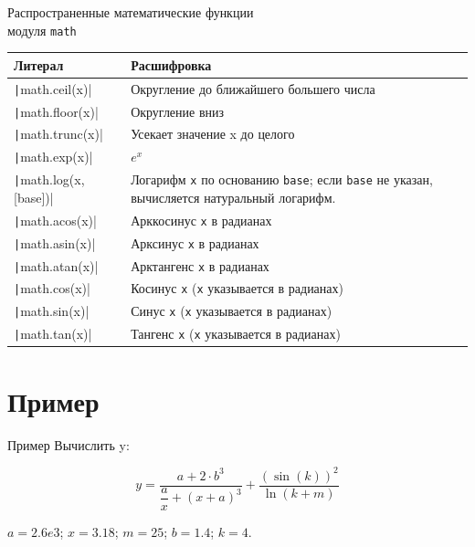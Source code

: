 \documentclass[aspectratio=169]{beamer}	%
\begin{document}
\begin{frame}[fragile]{Распространенные математические функции \\ модуля \texttt{math}}
\scriptsize
\begin{table}
\begin{tabular}{|p{.3\linewidth}|p{.69\linewidth}|}
	\hline
	\textbf{Литерал} & \textbf{Расшифровка} \\
	\hline
	\texttt|math.ceil(x)| & Округление до ближайшего большего числа \\
	\texttt|math.floor(x)| & Округление вниз \\
	\texttt|math.trunc(x)| & Усекает значение x до целого \\
	
	\texttt|math.exp(x)| & $e^x$ \\
	\texttt|math.log(x, [base])| & Логарифм \texttt{x} по основанию \texttt{base}; если \texttt{base} не указан, вычисляется натуральный логарифм. \\
	\texttt|math.acos(x)| & Арккосинус \texttt{x} в радианах \\
	\texttt|math.asin(x)| & Арксинус \texttt{x} в радианах \\
	\texttt|math.atan(x)| & Арктангенс \texttt{x} в радианах \\
	\texttt|math.cos(x)| & Косинус \texttt{x} (\texttt{x} указывается в радианах) \\
	\texttt|math.sin(x)| & Синус \texttt{x} (\texttt{x} указывается в радианах) \\
	\texttt|math.tan(x)| & Тангенс \texttt{x} (\texttt{x} указывается в радианах) \\
	\hline
\end{tabular}
\end{table}
\vfill
\end{frame}

\section{Пример}
\sectionframe

\begin{frame}[fragile]{Пример}
\footnotesize
Вычислить y:
\begin{Large}
\begin{equation*}
	y = \dfrac{a + 2 \cdot b ^ 3}{\dfrac{a}{x} + \left(x + a\right)^3} + \dfrac{\left(\sin\left(k\right)\right)^2}{\ln \left(k + m\right)}
\end{equation*}
\end{Large}

\begin{center}
$a = 2.6e3$; \quad $x = 3.18$; \quad $m = 25$; \quad $b = 1.4$; \quad $k = 4$.
\end{center}
\vfill
\end{frame}
\end{document}
